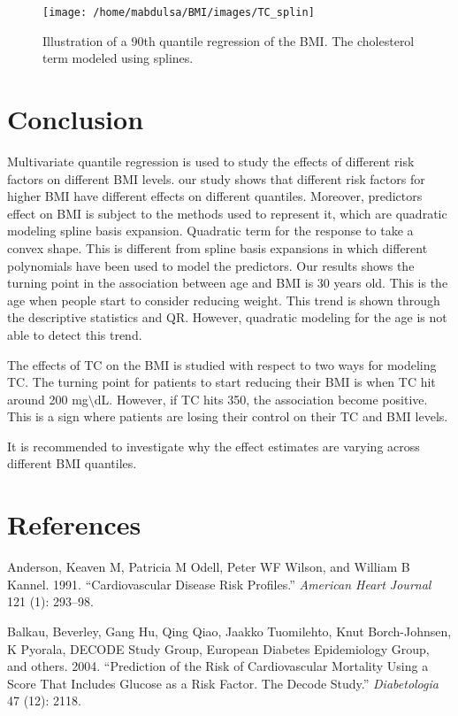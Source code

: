\documentclass[
  12pt,
]{article}
\begin{document}
\begin{figure}

{\centering \texttt{[image: /home/mabdulsa/BMI/images/TC\_splin]} 

}

\caption{ Illustration of a 90th quantile regression of the BMI. The cholesterol term modeled  using splines. }\label{fig:resu330}
\end{figure}

\section{Conclusion}

Multivariate quantile regression is used to study the effects of different risk factors on different BMI levels. our study shows that different risk factors for higher BMI have different effects on different quantiles. Moreover, predictors effect on BMI is subject to the methods used to represent it, which are quadratic modeling spline basis expansion. Quadratic term for the response to take a convex shape. This is different from spline basis expansions in which different polynomials have been used to model the predictors. Our results shows the turning point in the association between age and BMI is 30 years old. This is the age when people start to consider reducing weight. This trend is shown through the descriptive statistics and QR. However, quadratic modeling for the age is not able to detect this trend.

The effects of TC on the BMI is studied with respect to two ways for modeling TC. The turning point for patients to start reducing their BMI is when TC hit around 200 mg\(\setminus\)dL. However, if TC hits 350, the association become positive. This is a sign where patients are losing their control on their TC and BMI levels.

It is recommended to investigate why the effect estimates are varying across different BMI quantiles.

\newpage
\section{References}

\hypertarget{refs}{}
\leavevmode\hypertarget{ref-anderson1991}{}%
Anderson, Keaven M, Patricia M Odell, Peter WF Wilson, and William B Kannel. 1991. ``Cardiovascular Disease Risk Profiles.'' \emph{American Heart Journal} 121 (1): 293--98.

\leavevmode\hypertarget{ref-balkau2004prediction}{}%
Balkau, Beverley, Gang Hu, Qing Qiao, Jaakko Tuomilehto, Knut Borch-Johnsen, K Pyorala, DECODE Study Group, European Diabetes Epidemiology Group, and others. 2004. ``Prediction of the Risk of Cardiovascular Mortality Using a Score That Includes Glucose as a Risk Factor. The Decode Study.'' \emph{Diabetologia} 47 (12): 2118.
\end{document}
